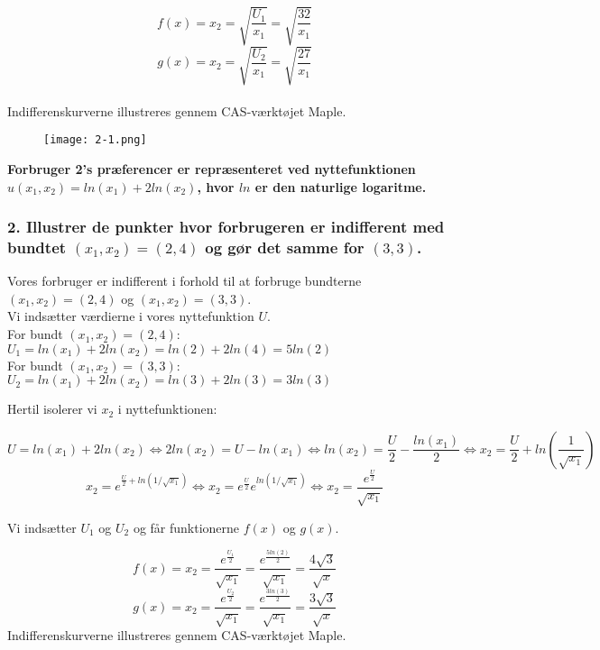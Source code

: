 \documentclass[a4paper, 12pt]{article}
\begin{document}
$$f(x) = x_{2} = \sqrt{\frac{U_{1}}{x_{1}}} = \sqrt{\frac{32}{x_{1}}}$$
$$g(x) = x_{2} = \sqrt{\frac{U_{2}}{x_{1}}} = \sqrt{\frac{27}{x_{1}}}$$
\\
Indifferenskurverne illustreres gennem CAS-værktøjet Maple.

\FloatBarrier
\begin{center}
	\begin{figure}[!ht]	
		\centering	
\texttt{[image: 2-1.png]}
		\caption{}
	\end{figure}
\end{center}
\FloatBarrier

\textbf{Forbruger 2's præferencer er repræsenteret ved nyttefunktionen $u(x_{1},x_{2}) = ln(x_{1}) + 2ln(x_{2})$, hvor $ln$ er den naturlige logaritme.}

\subsubsection*{2. Illustrer de punkter hvor forbrugeren er indifferent med bundtet $(x_{1},x_{2}) = (2,4)$ og gør det samme for $(3,3)$. }
Vores forbruger er indifferent i forhold til at forbruge bundterne $(x_{1},x_{2}) = (2,4)$ og $(x_{1},x_{2}) = (3,3)$. \\
Vi indsætter værdierne i vores nyttefunktion $U$.\\
For bundt $(x_{1},x_{2}) = (2,4)$: $U_{1} = ln(x_{1}) + 2ln(x_{2}) = ln(2) + 2ln(4) =5ln(2)$\\
For bundt $(x_{1},x_{2}) = (3,3)$: $U_{2} = ln(x_{1}) + 2ln(x_{2}) = ln(3) + 2ln(3) = 3ln(3)$

Hertil isolerer vi $x_{2}$ i nyttefunktionen: 

$$U =ln(x_{1}) + 2ln(x_{2}) \Leftrightarrow 2ln(x_{2}) = U - ln(x_{1}) \Leftrightarrow ln(x_{2}) = \frac{U}{2}-\frac{ln(x_{1})}{2} \Leftrightarrow x_{2} = \frac{U}{2} + ln \left( \frac{1}{\sqrt{x_{1}}} \right)$$
$$x_{2} = e^{\frac{U}{2} + ln(1 / \sqrt{x_{1}})}  \Leftrightarrow x_{2} = e^{\frac{U}{2}} e^{ln(1 / \sqrt{x_{1}})} \Leftrightarrow x_{2} = \frac{e^{\frac{U}{2}}}{\sqrt{x_{1}}} $$

Vi indsætter $U_{1}$ og $U_{2}$ og får funktionerne $f(x)$ og $g(x)$.

$$f(x) = x_{2} =  \frac{e^{\frac{U_{1}}{2}}}{\sqrt{x_{1}}} =  \frac{e^{\frac{5ln(2)}{2}}}{\sqrt{x_{1}}} = \frac{4\sqrt{3}}{\sqrt{x}} $$
$$g(x) = x_{2} = \frac{e^{\frac{U_{2}}{2}}}{\sqrt{x_{1}}}=  \frac{e^{\frac{3ln(3)}{2}}}{\sqrt{x_{1}}} = \frac{3\sqrt{3}}{\sqrt{x}} $$
Indifferenskurverne illustreres gennem CAS-værktøjet Maple.
\end{document}
